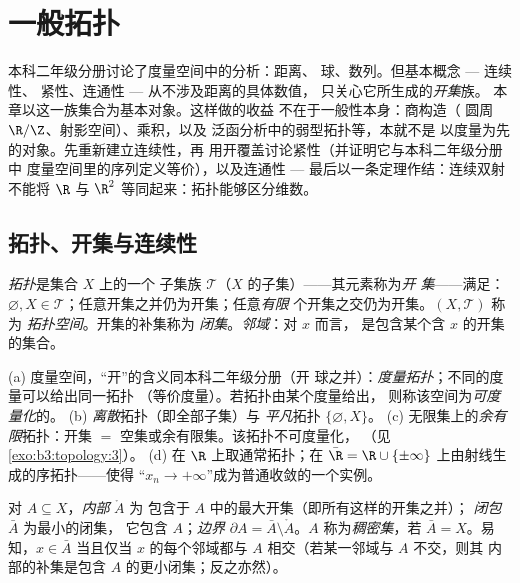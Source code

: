 \chapter{一般拓扑}\label{ch:b3:topology}

本科二年级分册讨论了度量空间中的分析：距离、
球、数列。但基本概念 --- 连续性、
紧性、连通性 --- 从不涉及距离的具体数值，
只关心它所生成的\emph{开集}族。
本章以这一族集合为基本对象。这样做的收益
不在于一般性本身：商构造（
圆周 $\R/\Z$、射影空间）、乘积，以及
泛函分析中的弱型拓扑等，本就不是
以度量为先的对象。先重新建立连续性，再
用开覆盖讨论紧性（并证明它与本科二年级分册中
度量空间里的序列定义等价），以及连通性 ---
最后以一条定理作结：连续双射不能将
$\R$ 与 $\R^2$ 等同起来：拓扑能够区分维数。

\section{拓扑、开集与连续性}

\begin{definition}\label{def:b3:topology:topology}
\emph{拓扑}是集合 $X$ 上的一个
子集族 $\mathcal T$（$X$ 的子集）——其元素称为\emph{开
集}——满足：$\varnothing, X \in
\mathcal T$；任意开集之并仍为开集；任意\emph{有限}
个开集之交仍为开集。$(X, \mathcal T)$ 称为
\emph{拓扑空间}。开集的补集称为
\emph{闭集}。\emph{邻域}：对 $x$ 而言，
是包含某个含 $x$ 的开集的集合。
\end{definition}

\begin{example}\label{ex:b3:topology:examples}
(a) 度量空间，“开”的含义同本科二年级分册（开
球之并）：\emph{度量拓扑}；不同的度量可以给出同一拓扑
（等价度量）。若拓扑由某个度量给出，
则称该空间为\emph{可度量化}的。
(b) \emph{离散}拓扑（即全部子集）与
\emph{平凡}拓扑 $\{\varnothing, X\}$。
(c) 无限集上的\emph{余有限}拓扑：开集 $=$
空集或余有限集。该拓扑不可度量化，
（见\cref{exo:b3:topology:3}）。
(d) 在 $\R$ 上取通常拓扑；在 $\bar\R = \R \cup
\{\pm\infty\}$ 上由射线生成的序拓扑——使得
“$x_n \to +\infty$”成为普通收敛的一个实例。
\end{example}

\begin{definition}\label{def:b3:topology:interior}
对 $A \subseteq X$，\emph{内部} $\mathring A$ 为
包含于 $A$ 中的最大开集（即所有这样的开集之并）；
\emph{闭包} $\bar A$ 为最小的闭集，
它包含 $A$；\emph{边界} $\partial A = \bar A
\setminus \mathring A$。$A$ 称为\emph{稠密集}，若
$\bar A = X$。易知，$x \in \bar A$ 当且仅当
$x$ 的每个邻域都与 $A$ 相交（若某一邻域与 $A$ 不交，则其
内部的补集是包含 $A$ 的更小闭集；反之亦然）。
\end{definition}

